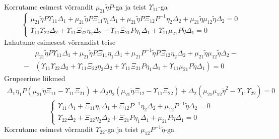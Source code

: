 \documentclass[class=article, crop=false]{standalone}
\begin{document}
Korrutame esimest võrrandit $ \mu_{21} \tilde{ \eta} P $-ga ja teist $ \Upsilon_{11} $-ga
\begin{equation}\label{key}
	\begin{cases}
		\mu_{21} \tilde{ \eta} P \Upsilon_{11} \Delta_{1} + \mu_{21} \tilde{ \eta} P \Xi_{11} \eta_{ 1} \Delta_{1} + \mu_{21} \tilde{ \eta} P \Xi_{12} P^{-1} \eta_{ 2} \Delta_{2} + \mu_{21} \tilde{ \eta} \mu_{12} \tilde{ \eta} \Delta_{2} = 0 \\
		\Upsilon_{11} \Upsilon_{22} \Delta_{2} + \Upsilon_{11} \Xi_{22} \eta_{ 2} \Delta_{2} + \Upsilon_{11} \Xi_{21} P \eta_{ 1} \Delta_{1} + \Upsilon_{11} \mu_{21} P \tilde{ \eta} \Delta_{1} = 0
	\end{cases}
\end{equation}
Lahutame esimesest võrrandist teise
\begin{equation}\label{key}
	\begin{split}
		& \mu_{21} \tilde{ \eta} P \Upsilon_{11} \Delta_{1} + \mu_{21} \tilde{ \eta} P \Xi_{11} \eta_{ 1} \Delta_{1} + \mu_{21} P^{-1} \tilde{ \eta} P \Xi_{12} \eta_{ 2} \Delta_{2} + \mu_{21} \tilde{ \eta} \mu_{12} \tilde{ \eta} \Delta_{2} - \\
		- & ( \Upsilon_{11} \Upsilon_{22} \Delta_{2} + \Upsilon_{11} \Xi_{22} \eta_{ 2} \Delta_{2} + \Upsilon_{11} \Xi_{21} P \eta_{ 1} \Delta_{1} + \Upsilon_{11} \mu_{21} P \tilde{ \eta} \Delta_{1}) = 0
	\end{split}
\end{equation}
Grupeerime liikmed
\begin{equation}\label{key}
	\begin{split}
		\Delta_{1} \eta_{ 1} P ( \mu_{21} \tilde{ \eta} \Xi_{11} - \Upsilon_{11} \Xi_{21}) + \Delta_{2} \eta_{ 2} ( \mu_{21} \tilde{ \eta} \Xi_{12} - \Upsilon_{11} \Xi_{22}) + \Delta_{2} ( \mu_{21} \mu_{12} \tilde{ \eta}^{2} - \Upsilon_{11} \Upsilon_{22}) = 0
	\end{split}
\end{equation}
\begin{equation}\label{key}
	\begin{cases}
		\Upsilon_{11} \Delta_{1} + \Xi_{11} \eta_{ 1} \Delta_{1} + \Xi_{12} P^{-1} \eta_{ 2} \Delta_{2} + \mu_{12} P^{ -1} \tilde{ \eta} \Delta_{2} = 0 \\
		\Upsilon_{22} \Delta_{2} + \Xi_{22} \eta_{ 2} \Delta_{2} + \Xi_{21} P \eta_{ 1} \Delta_{1} + \mu_{21} P \tilde{ \eta} \Delta_{1} = 0
	\end{cases}
\end{equation}
Korrutame esimest võrrandit $ \Upsilon_{22} $-ga ja teist $ \mu_{12} P^{-1} \tilde{ \eta} $-ga
\end{document}
